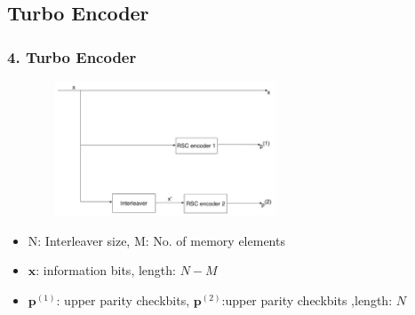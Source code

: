 \documentclass{beamer}  %
\newcommand\blfootnote[1]{%
  \begingroup
  \renewcommand\thefootnote{}\footnote{#1}%
  \addtocounter{footnote}{-1}%
  \endgroup
}
\begin{document}
\subsection{Turbo Encoder}
\begin{frame}
\frametitle{4. Turbo Encoder}

\begin{figure}
\centering
		\includegraphics[height = 4cm, width=0.65\textwidth]{TurboEncoder.pdf}
	\end{figure}


\begin{itemize}
\item N: Interleaver size, M: No. of memory elements
\item $\mathbf{x}$: information bits,  length: $N-M$
\item $\mathbf{p}^{(1)}$: upper parity checkbits, $\mathbf{p}^{(2)}$:upper parity checkbits ,length: $N$

\end{itemize}

\end{frame}



\end{document}
